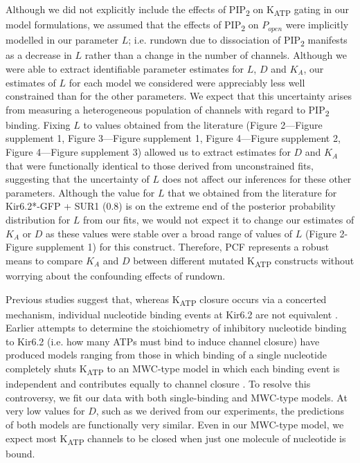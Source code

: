 \documentclass[10pt,lineno, doublespacing]{elife}
\begin{document}
Although we did not explicitly include the effects of PIP\textsubscript{2} on K\textsubscript{ATP} gating in our model formulations, we assumed that the effects of PIP\textsubscript{2} on $P_{open}$ were implicitly modelled in our parameter $L$; i.e. rundown due to dissociation of PIP\textsubscript{2} manifests as a decrease in $L$ rather than a change in the number of channels.
Although we were able to extract identifiable parameter estimates for $L$, $D$ and $K_A$, our estimates of $L$ for each model we considered were appreciably less well constrained than for the other parameters.
We expect that this uncertainty arises from measuring a heterogeneous population of channels with regard to PIP\textsubscript{2} binding.
Fixing $L$ to values obtained from the literature (Figure 2—Figure supplement 1, Figure 3—Figure supplement 1, Figure 4—Figure supplement 2, Figure 4—Figure supplement 3) allowed us to extract estimates for $D$ and $K_A$ that were functionally identical to those derived from unconstrained fits, suggesting that the uncertainty of $L$ does not affect our inferences for these other parameters.
Although the value for $L$ that we obtained from the literature for Kir6.2*-GFP + SUR1 (0.8) is on the extreme end of the posterior probability distribution for $L$ from our fits, we would not expect it to change our estimates of $K_A$ or $D$ as these values were stable over a broad range of values of $L$ (Figure 2-Figure supplement 1) for this construct.
Therefore, PCF represents a robust means to compare $K_A$ and $D$ between different mutated K\textsubscript{ATP} constructs without worrying about the confounding effects of rundown.

Previous studies suggest that, whereas K\textsubscript{ATP} closure occurs via a concerted mechanism, individual nucleotide binding events at Kir6.2 are not equivalent \citep{RN102}.
Earlier attempts to determine the stoichiometry of inhibitory nucleotide binding to Kir6.2 (i.e. how many ATPs must bind to induce channel closure) have produced models ranging from those in which binding of a single nucleotide completely shuts K\textsubscript{ATP} to an MWC-type model in which each binding event is independent and contributes equally to channel closure \citep{RN92, RN102, RN89, RN101, RN115, RN90, RN3}.
To resolve this controversy, we fit our data with both single-binding and MWC-type models.
At very low values for $D$, such as we derived from our experiments, the predictions of both models are functionally very similar.
Even in our MWC-type model, we expect most K\textsubscript{ATP} channels to be closed when just one molecule of nucleotide is bound.
\end{document}
